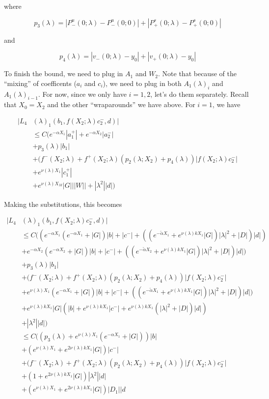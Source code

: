 \documentclass[12pt]{article}
\begin{document}
\begin{enumerate}
where

\[
p_3(\lambda) = |P^u_-(0;\lambda) - P^u_-(0; 0)| + |P^s_+(0;\lambda) - P^s_+(0;0)|
\]

and

\[
p_4(\lambda) = |v_-(0; \lambda) - y_0| + |v_+(0; \lambda) - y_0|
\]

To finish the bound, we need to plug in $A_1$ and $W_2$. Note that because of the ``mixing'' of coefficents ($a_i$ and $c_i$), we need to plug in both $A_1(\lambda)_i$ and $A_1(\lambda)_{i-1}$. For now, since we only have $i = 1, 2$, let's do them separately. Recall that $X_0 = X_2$ and the other ``wraparounds'' we have above. For $i = 1$, we have

\begin{align*}
|L_4&(\lambda)_1(b_1, f(X_2; \lambda) c_2^-, d)|\\ 
&\leq C( e^{-\alpha X_1} |a_1^+| + e^{-\alpha X_2} |a_2^-| \\
&+ p_3(\lambda) |b_1| \\
&+ (f^-(X_2; \lambda) + f^+(X_2; \lambda) (p_2(\lambda; X_2) + p_4(\lambda)) | f(X_2; \lambda) c_2^-| \\
&+ e^{\nu(\lambda)X_1} |c_1^+| \\
&+ e^{\nu(\lambda)X_M}|G| ||W|| + |\lambda^2||d|)
\end{align*}

Making the substitutions, this becomes

\begin{align*}
|L_4&(\lambda)_1(b_1, f(X_2; \lambda) c_2^-, d)|\\ 
&\leq C( (e^{-\alpha X_1}(e^{-\alpha X_1} + |G|) |b| + |c^-| + ((e^{-\tilde{\alpha} X_1} + e^{\nu(\lambda)k X_1} |G|) |\lambda|^2 + |D|) |d| ) \\
&+ e^{-\alpha X_2} (e^{-\alpha X_2} + |G|) |b| + |c^-| + ((e^{-\tilde{\alpha} X_2} + e^{\nu(\lambda)k X_1} |G|) |\lambda|^2 + |D|) |d| ) \\
&+ p_3(\lambda) |b_1| \\
&+ (f^-(X_2; \lambda) + f^+(X_2; \lambda) (p_2(\lambda; X_2) + p_4(\lambda)) | f(X_2; \lambda) c_2^-| \\
&+ e^{\nu(\lambda)X_1} (e^{-\alpha X_1} + |G|) |b| + |c^-| + ((e^{-\tilde{\alpha} X_1} + e^{\nu(\lambda)k X_1} |G|) |\lambda|^2 + |D|) |d| ) \\
&+ e^{\nu(\lambda)k X_1}|G| ( |b| + e^{\nu(\lambda)k X_1} |c^-| +  e^{\nu(\lambda)k X_1}(|\lambda|^2 + |D|) |d| )\\
&+ |\lambda^2||d|) \\
&\leq C( ( p_3(\lambda) + e^{\nu(\lambda)X_1} (e^{-\alpha X_1} + |G|)) |b| \\
&+ (e^{\nu(\lambda)X_1} + e^{2 \nu(\lambda)k X_1}|G|) |c^-| \\
&+ (f^-(X_2; \lambda) + f^+(X_2; \lambda) (p_2(\lambda; X_2) + p_4(\lambda)) | f(X_2; \lambda) c_2^-| \\
&+ (1 + e^{2 \nu(\lambda)k X_1}|G|)|\lambda^2||d| \\
&+ (e^{\nu(\lambda)X_1} + e^{2 \nu(\lambda)k X_1}|G| )|D_1||d
\end{align*}


\end{enumerate}
\end{document}
